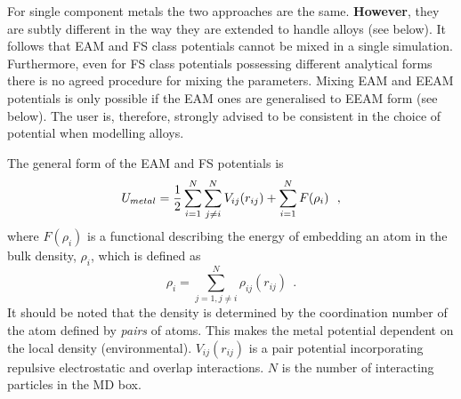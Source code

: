 For single component metals the two approaches are the same.  {\bf
However}, they are subtly different in the way they are extended to
handle alloys (see below).  It follows that EAM and FS class potentials
cannot be mixed in a single simulation.  Furthermore, even for FS
class potentials possessing different analytical forms there is no
agreed procedure for mixing the parameters.  Mixing EAM and EEAM
potentials is only possible if the EAM ones are generalised to EEAM
form (see below).  The user is, therefore, strongly advised to be
consistent in the choice of potential when modelling alloys.

The general form of the EAM and FS potentials is \cite{friedel-52a}
\begin{equation}
U_{metal} = {1 \over 2} \sum_{i=1}^{N} \sum_{j \ne i}^{N} V_{ij}(r_{ij}) +
\sum_{i=1}^{N} F(\rho_{i})~~, \label{um}
\end{equation}
where $F(\rho_{i})$ is a functional describing the energy of embedding
an atom in the bulk density, $\rho_{i}$, which is defined as
\begin{equation}
\rho_{i} = \sum_{j=1, j \ne i}^{N} \rho_{ij}(r_{ij})~~. \label{umd}
\end{equation}
It should be noted that the density is determined by the coordination
number of the atom defined by {\em pairs} of atoms.  This makes the
metal potential dependent on the local density (environmental).
$V_{ij}(r_{ij})$ is a pair potential incorporating repulsive
electrostatic and overlap interactions.  $N$ is the number of
interacting particles in the MD box.

